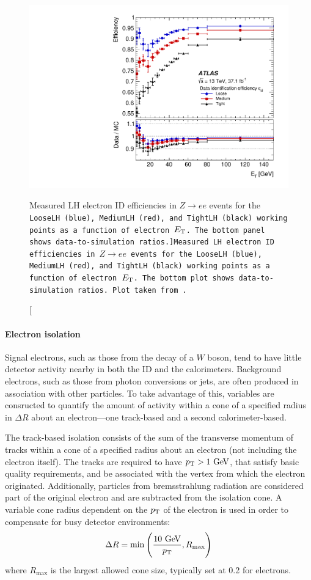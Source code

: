 \begin{figure}[htbp]
  \centering
  \includegraphics[width=.6\textwidth]{figs/detector/electron_id_efficiency}
  \caption[Measured LH electron ID efficiencies in $Z\rightarrow ee$ events for the \tt{LooseLH} (blue), \tt{MediumLH} (red), and \tt{TightLH} (black) working points as a function of electron $E_{\mathrm{T}}$. The bottom panel shows data-to-simulation ratios.]{Measured LH electron ID efficiencies in $Z\rightarrow ee$ events for the \tt{LooseLH} (blue), \tt{MediumLH} (red), and \tt{TightLH} (black) working points as a function of electron $E_{\mathrm{T}}$. The bottom plot shows data-to-simulation ratios. Plot taken from~\cite{2019.electron-reco-id}.}
  \label{fig:electron_id_efficiency}
\end{figure}

\paragraph*{Electron isolation}
Signal electrons, such as those from the decay of a $W$ boson, tend to have little detector activity nearby in both the ID and the calorimeters.
Background electrons, such as those from photon conversions or jets, are often produced in association with other particles.
To take advantage of this, variables are consructed to quantify the amount of activity within a cone of a specified radius in $\Delta R$ about an electron---one track-based and a second calorimeter-based.

The track-based isolation consists of the sum of the transverse momentum of tracks within a cone of a specified radius about an electron (not including the electron itself).
The tracks are required to have $\pt > 1\gev$, that satisfy basic quality requirements, and be associated with the vertex from which the electron originated.
Additionally, particles from bremsstrahlung radiation are considered part of the original electron and are subtracted from the isolation cone.
A variable cone radius dependent on the $p_{\mathrm{T}}$ of the electron is used in order to compensate for busy detector environments:
\begin{equation}
  \Delta R = \min\Bigg(\frac{10\gev}{\pt},R_{\textrm{max}}\Bigg)
  \label{eq:varcone}
\end{equation}
where $R_{\textrm{max}}$ is the largest allowed cone size, typically set at 0.2 for electrons.

